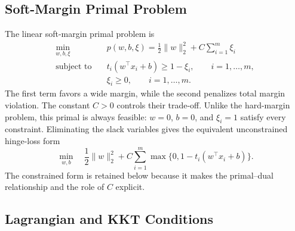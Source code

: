\documentclass[11pt,a4paper]{article}
\numberwithin{equation}{section} %
\begin{document}
\subsection{Soft-Margin Primal Problem}

The linear soft-margin primal problem is \cite{cortes1995,lec-statlearn}
\begin{equation}
\begin{aligned}
\min_{w,b,\xi}\quad
&p(w,b,\xi)=\frac12\lVert w\rVert_2^2+C\sum_{i=1}^{m}\xi_i\\
\text{subject to}\quad
&t_i(w^\top x_i+b)\geq1-\xi_i,\qquad i=1,\ldots,m,\\
&\xi_i\geq0,\qquad i=1,\ldots,m.
\end{aligned}
\end{equation}
The first term favors a wide margin, while the second penalizes total margin
violation. The constant $C>0$ controls their trade-off. Unlike the hard-margin
problem, this primal is always feasible: $w=0$, $b=0$, and $\xi_i=1$ satisfy
every constraint. Eliminating the slack variables gives the equivalent
unconstrained hinge-loss form
\begin{equation}
    \min_{w,b}\quad
    \frac12\lVert w\rVert_2^2
    +C\sum_{i=1}^{m}\max\{0,1-t_i(w^\top x_i+b)\}.
\end{equation}
The constrained form is retained below because it makes the primal--dual
relationship and the role of $C$ explicit.

\subsection{Lagrangian and KKT Conditions}
\end{document}
